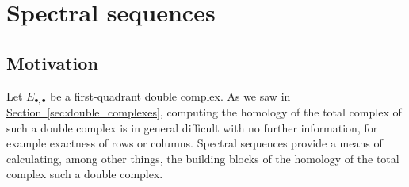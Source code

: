 \documentclass[main.tex]{subfiles}
\begin{document}
\chapter{Spectral sequences}
\label{ch:spectral_sequences}

\section{Motivation}
\label{sec:motivation_spectral_sequences}

Let $E_{\bullet,\bullet}$ be a first-quadrant double complex. As we saw in \hyperref[sec:double_complexes]{Section~\ref*{sec:double_complexes}}, computing the homology of the total complex of such a double complex is in general difficult with no further information, for example exactness of rows or columns. Spectral sequences provide a means of calculating, among other things, the building blocks of the homology of the total complex such a double complex.
\end{document}
